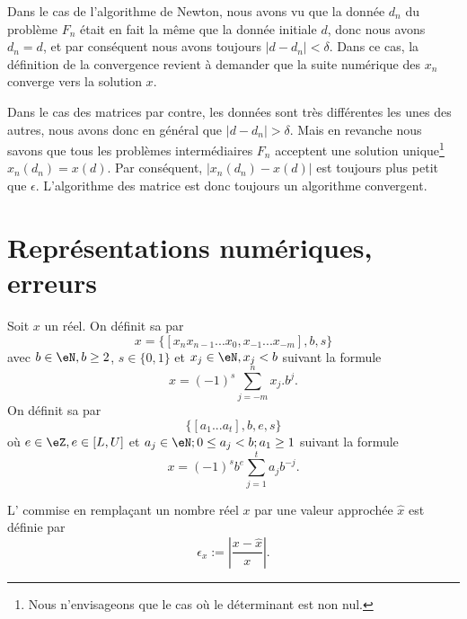 \begin{remark}		\label{RemConvAlgoNewton}
Dans le cas de l'algorithme de Newton, nous avons vu que la donnée $d_n$ du problème $F_n$ était en fait la même que la donnée initiale $d$, donc nous avons $d_n=d$, et par conséquent nous avons toujours $| d-d_n |<\delta$. Dans ce cas, la définition de la convergence revient à demander que la suite numérique des $x_n$ converge vers la solution $x$.
\end{remark}

\begin{remark}
Dans le cas des matrices par contre, les données sont très différentes les unes des autres, nous avons donc en général que $| d-d_n |>\delta$. Mais en revanche nous savons que tous les problèmes intermédiaires $F_n$ acceptent une solution unique\footnote{Nous n'envisageons que le cas où le déterminant est non nul.} $x_n(d_n)=x(d)$. Par conséquent, $| x_n(d_n)-x(d) |$ est toujours plus petit que $\epsilon$. L'algorithme des matrice est donc toujours un algorithme convergent.
\end{remark}

\section{Représentations numériques, erreurs}

\begin{definition}
	Soit $x$ un réel. On définit sa  par 
	\begin{equation}
		x=\{[x_nx_{n-1}...x_0,x_{-1}...x_{-m}], b, s\}
	\end{equation}
	avec  $b\in\eN, b\geq2$, $s\in\{0,1\}$ et $x_j\in\eN,x_j<b$ suivant la formule
	\begin{equation}
		x=(-1)^{s}\sum_{j=-m}^nx_j.b^j.
	\end{equation}
	On définit sa  par 
	\begin{equation}
		\{[a_1...a_t],b,e,s\}
	\end{equation}
	où $e\in\eZ,e\in[L,U]$ et $a_j\in\eN;0\leq a_j<b; a_1\geq1$ suivant la formule
	\begin{equation}		\label{EqRepreFlotNOrm}
		x=(-1)^sb^e\sum_{j=1}^ta_jb^{-j}.
	\end{equation}
\end{definition}

\begin{definition}
	L' commise en remplaçant un nombre réel $x$ par une valeur approchée $\hat{x}$ est définie par 
	\begin{equation}
		\epsilon_x:=\left|\frac{x-\hat{x}}{x}\right|.
	\end{equation}
\end{definition}

